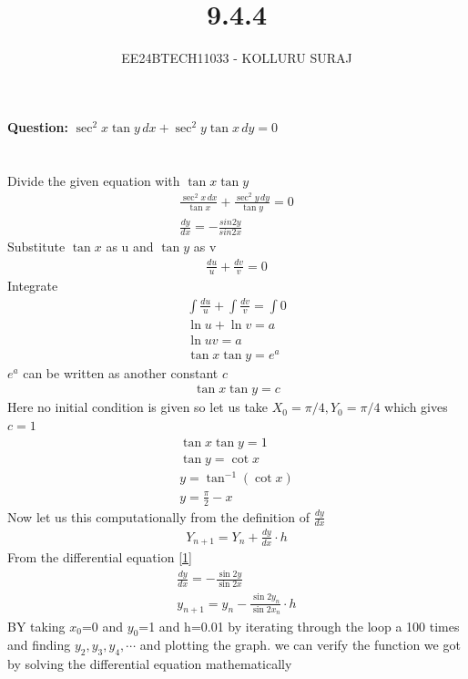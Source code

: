\documentclass[journal]{IEEEtran}
\numberwithin{equation}{enumi}
\numberwithin{figure}{enumi}
\begin{document}

\title{9.4.4}
\author{EE24BTECH11033 - KOLLURU SURAJ}
{\let\newpage\relax\maketitle}
\textbf{Question:} 
$\sec^2 x \tan y \, dx + \sec^2 y \tan x \, dy = 0$
\\\\
\solution\\
Divide the given equation with $\tan x \tan y$
\begin{align}
    \frac{\sec^2 x \, dx}{\tan x} + \frac{\sec^2 y \, dy}{\tan y} = 0\\
    \frac{dy}{dx}=-\frac{sin2y}{sin2x}\label{1}
\end{align}
Substitute $\tan x$ as u and $\tan y$ as v
\begin{align}
    \frac{du}{u} + \frac{dv}{v} = 0
\end{align}
Integrate
\begin{align}
\int  \frac{du}{u} + \int \frac{dv}{v} = \int 0\\
    \ln u + \ln v = a\\
    \ln uv = a\\
    \tan x \tan y = e^a
\end{align}
 $e^a$ can be written as another constant $c$
 \begin{align}
      \tan x \tan y = c
 \end{align}
Here no initial condition is given so let us take $X_{0}=\pi/4,Y_{0}=\pi/4$ which gives $c=1$
\begin{align}
    \tan x \tan y = 1\\
    \tan y = \cot x\\
    y = \tan^{-1}(\cot x)\\
    y= \frac{\pi}{2}- x
\end{align}
Now let us  this computationally from the definition of $\frac{dy}{dx}$ 
\begin{align}
    Y_{n+1}=Y_n+\frac{dy}{dx}\cdot h
\end{align}
From the differential equation \ref{1}
\begin{align}
    \frac{dy}{dx}=-\frac{\sin 2y}{\sin 2x}\\
    y_{n+1}=y_n-\frac{\sin 2y_n}{\sin 2x_n}\cdot h
\end{align}
BY taking $x_0$=0 and $y_0$=1 and h=0.01  by iterating through the loop a 100 times and finding $y_2,y_3,y_4,\cdots$ and plotting the graph. we can verify the function we got by solving the differential equation mathematically
\end{document}
